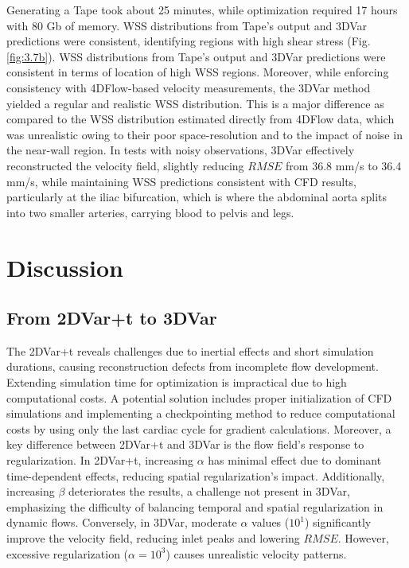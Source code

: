 Generating a Tape took about 25 minutes, while optimization required 17 hours with 80 Gb of memory. WSS distributions from Tape's output and 3DVar predictions were consistent, identifying regions with high shear stress (Fig. \ref{fig:3.7b}). WSS distributions from Tape's output and 3DVar predictions were consistent in terms of location of high WSS regions. Moreover, while enforcing consistency with 4DFlow-based velocity measurements, the 3DVar method yielded a regular and realistic WSS distribution. This is a major difference as compared to the WSS distribution estimated directly from 4DFlow data, which was unrealistic owing to their poor space-resolution and to the impact of noise in the near-wall region. In tests with noisy observations, 3DVar effectively reconstructed the velocity field, slightly reducing \(RMSE\) from 36.8 mm/s to 36.4 mm/s, while maintaining WSS predictions consistent with CFD results, particularly at the iliac bifurcation, which is where the abdominal aorta splits into two smaller arteries, carrying blood to pelvis and legs.


\section*{Discussion}

\subsection*{From 2DVar+t to 3DVar}
The 2DVar+t reveals challenges due to inertial effects and short simulation durations, causing reconstruction defects from incomplete flow development. Extending simulation time for optimization is impractical due to high computational costs. A potential solution includes proper initialization of CFD simulations and implementing a checkpointing method to reduce computational costs by using only the last cardiac cycle for gradient calculations.
Moreover, a key difference between 2DVar+t and 3DVar is the flow field's response to regularization. In 2DVar+t, increasing $\alpha$ has minimal effect due to dominant time-dependent effects, reducing spatial regularization's impact. Additionally, increasing $\beta$ deteriorates the results, a challenge not present in 3DVar, emphasizing the difficulty of balancing temporal and spatial regularization in dynamic flows. Conversely, in 3DVar, moderate $\alpha$ values ($10^{1}$) significantly improve the velocity field, reducing inlet peaks and lowering \(RMSE\). However, excessive regularization ($\alpha = 10^{3}$) causes unrealistic velocity patterns. 

